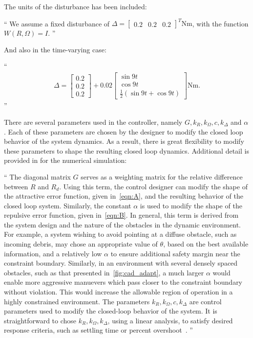 \documentclass[11pt]{article}
\newcommand{\parenth}[1]{\ensuremath{\left( #1 \right)}}
\newenvironment{correction}{\begin{list}{}{\setlength{\leftmargin}{1cm}\setlength{\rightmargin}{1cm}}\vspace{\parsep}\item[]``}{''\end{list}}
\begin{document}
\begin{enumerate}
The units of the disturbance has been included:
\begin{correction}
    We assume a fixed disturbance of \(\Delta = \begin{bmatrix} 0.2 & 0.2 & 0.2 \end{bmatrix}^T \si{\newton\meter}\), with the function \( W(R,\Omega) = I \).
\end{correction}
And also in the time-varying case:
\begin{correction}
    \begin{align*}
    \Delta = \begin{bmatrix} 0.2 \\ 0.2 \\0.2 \end{bmatrix} + 0.02 \begin{bmatrix} \sin 9 t \\ \cos 9 t \\ \frac{1}{2} \parenth{\sin 9t + \cos 9t}\end{bmatrix} \si{\newton\meter}.
    \end{align*}
\end{correction}
There are several parameters used in the controller, namely \( G, k_R, k_\Omega, c, k_\Delta\) and \(\alpha\).
Each of these parameters are chosen by the designer to modify the closed loop behavior of the system dynamics. 
As a result, there is great flexibility to modify these parameters to shape the resulting closed loop dynamics. 
Additional detail is provided in for the numerical simulation:
\begin{correction}
    The diagonal matrix \( G \) serves as a weighting matrix for the relative difference between \( R \) and \( R_d \). 
    Using this term, the control designer can modify the shape of the attractive error function, given in~\cref{eqn:A}, and the resulting behavior of the closed loop system.
    Similarly, the constant \( \alpha \) is used to modify the shape of the repulsive error function, given in~\cref{eqn:B}.
    In general, this term is derived from the system design and the nature of the obstacles in the dynamic environment.
    For example, a system wishing to avoid pointing at a diffuse obstacle, such as incoming debris, may chose an appropriate value of \( \theta \), based on the best available information, and a relatively low \( \alpha \) to ensure additional safety margin near the constraint boundary. 
    Similarly, in an environment with several densely spaced obstacles, such as that presented in~\cref{fig:cad_adapt}, a much larger \( \alpha \) would enable more aggressive manuevers which pass closer to the constraint boundary without violation.
    This would increase the allowable region of operation in a highly constrained environment.
    The parameters \( k_R, k_\Omega, c, k_\Delta\) are control parameters used to modify the closed-loop behavior of the system.
    It is straightforward to chose \( k_R, k_\Omega, k_\Delta\), using a linear analysis, to satisfy desired response criteria, such as settling time or percent overshoot~\cite{nise2004}.
\end{correction}


\end{enumerate}
\end{document}
